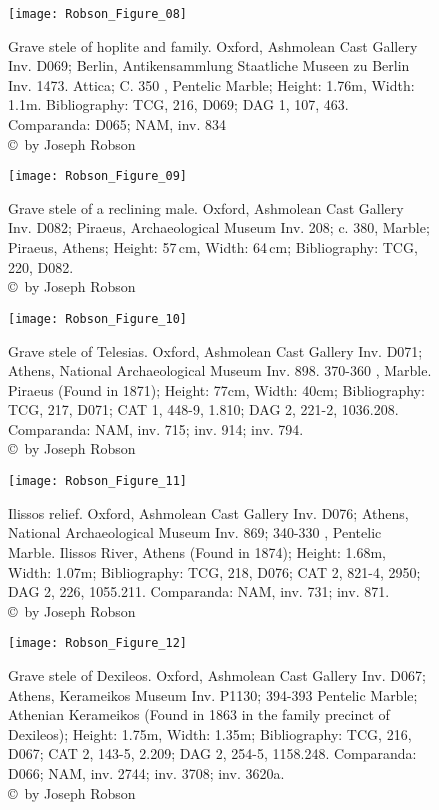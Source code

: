 \begin{figure}[!p]
	\texttt{[image: Robson\_Figure\_08]}

	\caption{Grave stele of hoplite and family. Oxford, Ashmolean Cast Gallery Inv. D069; Berlin, Antikensammlung Staatliche Museen zu Berlin Inv. 1473. Attica; C. 350 \BC, Pentelic Marble; Height: 1.76m, Width: 1.1m. Bibliography: TCG, 216, D069; DAG 1, 107, 463.
		Comparanda: D065; NAM, inv. 834
		{\normalfont\scriptsize \\ \copyright\ by Joseph Robson}}
	\label{fig:Robson_Figure_08}
\end{figure}
\clearpage
\begin{figure}[!p]
	\texttt{[image: Robson\_Figure\_09]}

	\caption{Grave stele of a reclining male. Oxford, Ashmolean Cast Gallery Inv. D082; Piraeus, Archaeological Museum Inv. 208; c. 380\BC, Marble; Piraeus, Athens; Height: 57\,cm, Width: 64\,cm; Bibliography: TCG, 220, D082.
		{\normalfont\scriptsize \\ \copyright\ by Joseph Robson}}
	\label{fig:Robson_Figure_09}
\end{figure}
\clearpage
\begin{figure}[!p]
	\texttt{[image: Robson\_Figure\_10]}

	\caption{Grave stele of Telesias. Oxford, Ashmolean Cast Gallery Inv. D071; Athens, National Archaeological Museum Inv. 898. 370-360 \BC, Marble. Piraeus (Found in 1871); Height: 77cm, Width: 40cm; Bibliography: TCG, 217, D071; CAT 1, 448-9, 1.810; DAG 2, 221-2, 1036.208.
		Comparanda: NAM, inv. 715; inv. 914; inv. 794.
		{\normalfont\scriptsize \\ \copyright\ by Joseph Robson}}
	\label{fig:Robson_Figure_10}
\end{figure}
\clearpage
\begin{figure}[!p]
	\texttt{[image: Robson\_Figure\_11]}

	\caption{Ilissos relief. Oxford, Ashmolean Cast Gallery Inv. D076; Athens, National Archaeological Museum Inv. 869; 340-330 \BC, Pentelic Marble. Ilissos River, Athens (Found in 1874); Height: 1.68m, Width: 1.07m; Bibliography: TCG, 218, D076; CAT 2, 821-4, 2950; DAG 2, 226, 1055.211.
		Comparanda: NAM, inv. 731; inv. 871.
		{\normalfont\scriptsize \\ \copyright\ by Joseph Robson}}
	\label{fig:Robson_Figure_11}
\end{figure}
\clearpage
\begin{figure}[!p]
	\texttt{[image: Robson\_Figure\_12]}

	\caption{Grave stele of Dexileos. Oxford, Ashmolean Cast Gallery Inv. D067; Athens, Kerameikos Museum Inv. P1130; 394-393 \BC Pentelic Marble; Athenian Kerameikos (Found in 1863 in the family precinct of Dexileos); Height: 1.75m, Width: 1.35m; Bibliography: TCG, 216, D067; CAT 2, 143-5, 2.209; DAG 2, 254-5, 1158.248.
		Comparanda: D066; NAM, inv. 2744; inv. 3708; inv. 3620a.
		{\normalfont\scriptsize \\ \copyright\ by Joseph Robson}}
	\label{fig:Robson_Figure_12}
\end{figure}

